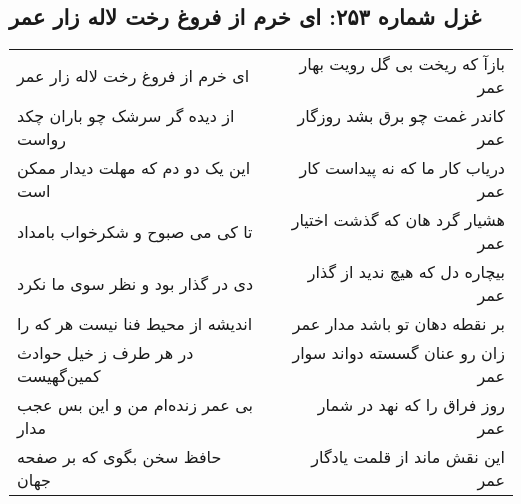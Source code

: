 \begin{center}
\section*{غزل شماره ۲۵۳: ای خرم از فروغ رخت لاله زار عمر}
\label{sec:sh253}
\begin{longtable}{l p{0.5cm} r}
ای خرم از فروغ رخت لاله زار عمر
&&
بازآ که ریخت بی گل رویت بهار عمر
\\
از دیده گر سرشک چو باران چکد رواست
&&
کاندر غمت چو برق بشد روزگار عمر
\\
این یک دو دم که مهلت دیدار ممکن است
&&
دریاب کار ما که نه پیداست کار عمر
\\
تا کی می صبوح و شکرخواب بامداد
&&
هشیار گرد هان که گذشت اختیار عمر
\\
دی در گذار بود و نظر سوی ما نکرد
&&
بیچاره دل که هیچ ندید از گذار عمر
\\
اندیشه از محیط فنا نیست هر که را
&&
بر نقطه دهان تو باشد مدار عمر
\\
در هر طرف ز خیل حوادث کمین‌گهیست
&&
زان رو عنان گسسته دواند سوار عمر
\\
بی عمر زنده‌ام من و این بس عجب مدار
&&
روز فراق را که نهد در شمار عمر
\\
حافظ سخن بگوی که بر صفحه جهان
&&
این نقش ماند از قلمت یادگار عمر
\\
\end{longtable}
\end{center}
